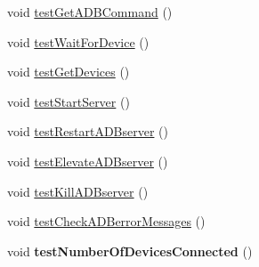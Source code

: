 \begin{DoxyCompactItemize}
\item 
void \hyperlink{class_c_a_s_u_a_l_1_1communicationstools_1_1adb_1_1_a_d_b_tools_test_a4bd3feb4570aea2eb5ecb60ea042e79b}{test\-Get\-A\-D\-B\-Command} ()
\item 
void \hyperlink{class_c_a_s_u_a_l_1_1communicationstools_1_1adb_1_1_a_d_b_tools_test_ae493f80c12bad48df6a0e6333cac0da6}{test\-Wait\-For\-Device} ()
\item 
void \hyperlink{class_c_a_s_u_a_l_1_1communicationstools_1_1adb_1_1_a_d_b_tools_test_a49abf50ecda203b8b24cdf7fd168e17e}{test\-Get\-Devices} ()
\item 
void \hyperlink{class_c_a_s_u_a_l_1_1communicationstools_1_1adb_1_1_a_d_b_tools_test_a316c831262db3eec3660ce594573bc08}{test\-Start\-Server} ()
\item 
void \hyperlink{class_c_a_s_u_a_l_1_1communicationstools_1_1adb_1_1_a_d_b_tools_test_a65dd747876f6520cc07b741fd8bf7ab0}{test\-Restart\-A\-D\-Bserver} ()
\item 
void \hyperlink{class_c_a_s_u_a_l_1_1communicationstools_1_1adb_1_1_a_d_b_tools_test_af5edfaca3c527f176c61eb11acc310ad}{test\-Elevate\-A\-D\-Bserver} ()
\item 
void \hyperlink{class_c_a_s_u_a_l_1_1communicationstools_1_1adb_1_1_a_d_b_tools_test_a6bbcf77c3d96158d3db45fa799c36855}{test\-Kill\-A\-D\-Bserver} ()
\item 
void \hyperlink{class_c_a_s_u_a_l_1_1communicationstools_1_1adb_1_1_a_d_b_tools_test_aee862c506bd3d10846b709845f082d0d}{test\-Check\-A\-D\-Berror\-Messages} ()
\item 
\hypertarget{class_c_a_s_u_a_l_1_1communicationstools_1_1adb_1_1_a_d_b_tools_test_a2c7eecaf85e45959d40b565869500ef3}{void {\bfseries test\-Number\-Of\-Devices\-Connected} ()}\label{class_c_a_s_u_a_l_1_1communicationstools_1_1adb_1_1_a_d_b_tools_test_a2c7eecaf85e45959d40b565869500ef3}


\end{DoxyCompactItemize}
